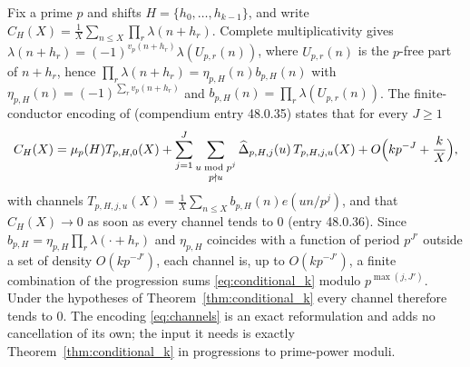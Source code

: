 \begin{remark}
\label{rem:channels}
Fix a prime $p$ and shifts $H=\{h_0,\dots,h_{k-1}\}$, and write $C_H(X)=\frac1X\sum_{n\le X}\prod_r\lambda(n+h_r)$. Complete multiplicativity gives $\lambda(n+h_r)=(-1)^{v_p(n+h_r)}\lambda(U_{p,r}(n))$, where $U_{p,r}(n)$ is the $p$-free part of $n+h_r$, hence $\prod_r\lambda(n+h_r)=\eta_{p,H}(n)b_{p,H}(n)$ with $\eta_{p,H}(n)=(-1)^{\sum_rv_p(n+h_r)}$ and $b_{p,H}(n)=\prod_r\lambda(U_{p,r}(n))$. The finite-conductor encoding of \cite{CasanaPadic} (compendium entry 48.0.35) states that for every $J\ge1$
\begin{equation}
C_H(X)=\mu_p(H)T_{p,H,0}(X)+\sum_{j=1}^J\sum_{\substack{u\bmod p^j\\ p\nmid u}}\widehat{\Delta}_{p,H,j}(u)\,T_{p,H,j,u}(X)+O\Bigl(kp^{-J}+\frac kX\Bigr),
\label{eq:channels}
\end{equation}
with channels $T_{p,H,j,u}(X)=\frac1X\sum_{n\le X}b_{p,H}(n)e(un/p^j)$, and that $C_H(X)\to0$ as soon as every channel tends to $0$ (entry 48.0.36). Since $b_{p,H}=\eta_{p,H}\prod_r\lambda(\cdot+h_r)$ and $\eta_{p,H}$ coincides with a function of period $p^{J'}$ outside a set of density $O(kp^{-J'})$, each channel is, up to $O(kp^{-J'})$, a finite combination of the progression sums \eqref{eq:conditional_k} modulo $p^{\max(j,J')}$. Under the hypotheses of Theorem~\ref{thm:conditional_k} every channel therefore tends to $0$. The encoding \eqref{eq:channels} is an exact reformulation and adds no cancellation of its own; the input it needs is exactly Theorem~\ref{thm:conditional_k} in progressions to prime-power moduli.
\end{remark}


